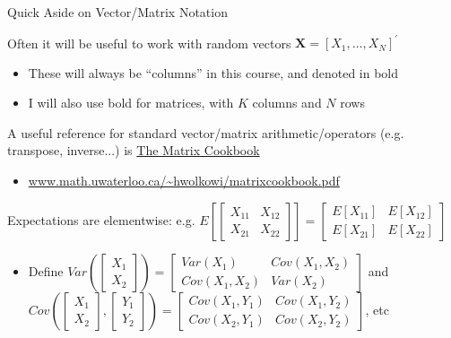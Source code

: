 \documentclass[11pt,english,handout]{beamer}
\begin{document}
\begin{frame}{Quick Aside on Vector/Matrix Notation}

\vspace{0.2cm}
Often it will be useful to work with random vectors $\mathbf{X}=[X_1,\dots,X_N]^\prime$

\begin{itemize}
\item These will always be ``columns'' in this course, and denoted in bold
\vspace{0.1cm}
\item I will also use bold for matrices, with $K$ columns and $N$ rows
\end{itemize}\vspace{0.4cm}\pause{}

A useful reference for standard vector/matrix arithmetic/operators (e.g. transpose, inverse...) is \uline{The Matrix Cookbook }

\begin{itemize}
\item \url{www.math.uwaterloo.ca/~hwolkowi/matrixcookbook.pdf}
\end{itemize}\vspace{0.4cm}\pause{}

Expectations are elementwise: e.g. $E\left[\begin{bmatrix}X_{11}& X_{12}\\X_{21} & X_{22}\end{bmatrix}\right]=\begin{bmatrix}E[X_{11}]& E[X_{12}]\\E[X_{21}] & E[X_{22}]\end{bmatrix}$ 
\begin{itemize}
\item Define $Var\left(\begin{bmatrix}X_{1}\\X_{2}\end{bmatrix}\right)=\begin{bmatrix}Var(X_{1}) & Cov(X_{1},X_{2})\\Cov(X_{1},X_{2}) & Var(X_{2})\end{bmatrix}$ and $Cov\left(\begin{bmatrix}X_{1}\\X_{2}\end{bmatrix},\begin{bmatrix}Y_{1}\\Y_{2}\end{bmatrix}\right)=\begin{bmatrix}Cov(X_{1},Y_{1}) & Cov(X_{1},Y_{2})\\Cov(X_{2},Y_{1}) & Cov(X_{2},Y_{2})\end{bmatrix}$, etc
\end{itemize}

\end{frame}
\end{document}
